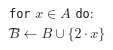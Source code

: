 \documentclass[preview]{standalone}
\begin{document}
\begin{center}
\texttt{for} $x \in A$ \texttt{do}:\\ \t$B \leftarrow B \cup \{2 \cdot x\}$
\end{center}
\end{document}
